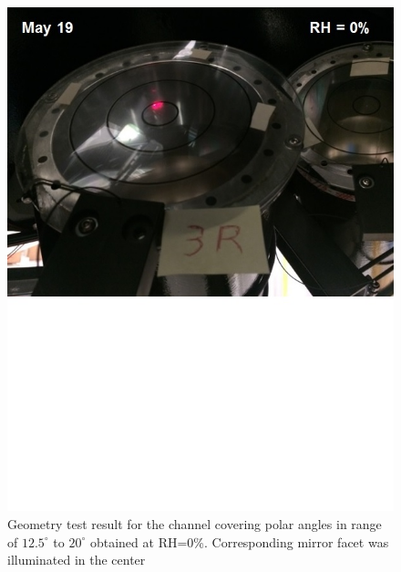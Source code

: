 \begin{figure}[h]
    \centering
    \includegraphics[width=1.0\linewidth,trim={0 8.5cm 0 0},clip]{images/GEO_TEST_3_Zero.jpg}
    \caption{Geometry test result for the channel covering polar angles in range of $12.5^\circ$ to $20^\circ$ obtained at RH=0\%. Corresponding mirror facet was illuminated in the center}
    \label{fig:GEO_TEST_3_Zero}
\end{figure}
        
